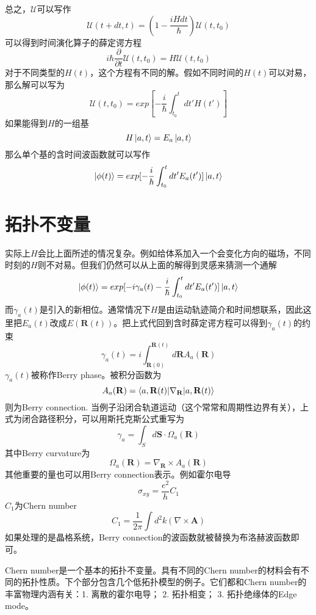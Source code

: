 总之，$\mathscr{U}$可以写作
\begin{equation}
  \mathscr{U}(t + dt, t) = (1 - \frac{iH dt}{\hbar}) \mathscr{U}(t, t_0)
\end{equation}
可以得到时间演化算子的薛定谔方程
\begin{equation}
  i\hbar\frac{\partial}{\partial t} \mathscr{U}(t, t_0) = H\mathscr{U}(t, t_0)
\end{equation}
对于不同类型的$H(t)$，这个方程有不同的解。假如不同时间的$H(t)$可以对易，那么解可以写为
\begin{equation}
  \mathscr{U}(t, t_0) = exp[-\frac{i}{\hbar} \int_{t_0}^{t} dt' H(t') ]
\end{equation}
如果能得到$H$的一组基
\begin{equation}
  H \ket{a, t} = E_a \ket{a, t}
\end{equation}
那么单个基的含时间波函数就可以写作
\begin{equation}
  \ket{\phi(t)} = exp[-\frac{i}{\hbar} \int_{t_0}^{t} dt' E_a(t') ] \ket{a, t}
\end{equation}

\section{拓扑不变量}

实际上$H$会比上面所述的情况复杂。例如给体系加入一个会变化方向的磁场，不同时刻的$H$则不对易。但我们仍然可以从上面的解得到灵感来猜测一个通解
\begin{equation}
  \ket{\phi(t)} = exp[- i \gamma_a(t) -\frac{i}{\hbar} \int_{t_0}^{t} dt' E_a(t') ] \ket{a, t}
\end{equation}
而$\gamma_{a}(t)$是引入的新相位。通常情况下$H$是由运动轨迹简介和时间想联系，因此这里把$E_a(t)$改成$E(\mathbf{R}(t))$。把上式代回到含时薛定谔方程可以得到$\gamma_a(t)$的约束
\begin{equation}
  \gamma_a(t) = i \int_{\mathbf{R}(0)}^{\mathbf{R}(t)}{d\mathbf{R}} A_a(\mathbf{R})
\end{equation}
$\gamma_a(t)$被称作Berry phase。被积分函数为
\begin{equation}
  A_a(\mathbf{R}) = \braket{a, \mathbf{R}(t) | \nabla_{\mathbf{R}} | a, \mathbf{R}(t)}
\end{equation}
则为Berry connection. 当例子沿闭合轨道运动（这个常常和周期性边界有关），上式为闭合路径积分，可以用斯托克斯公式重写为
\begin{equation}
  \gamma_a = \int_{S}{d\mathbf{S}} \cdot \Omega_a(\mathbf{R})
\end{equation}
其中Berry curvature为
\begin{equation}
\Omega_a(\mathbf{R}) = \nabla_{\mathbf{R}} \times A_a(\mathbf{R})
\end{equation}
其他重要的量也可以用Berry connection表示。例如霍尔电导
\begin{equation}
  \sigma_{xy} = \frac{e^2}{h}C_1
  \label{hallInduc}
\end{equation}
$C_1$为Chern number
\begin{equation}
  C_1 = \frac{1}{2 \pi} \int{d^2k}(\nabla \times \mathbf{A})
\end{equation}
如果处理的是晶格系统，Berry connection的波函数就被替换为布洛赫波函数即可。

Chern number是一个基本的拓扑不变量。具有不同的Chern number的材料会有不同的拓扑性质。下个部分包含几个低拓扑模型的例子。它们都和Chern number的丰富物理内涵有关：1. 离散的霍尔电导； 2. 拓扑相变； 3. 拓扑绝缘体的Edge mode。